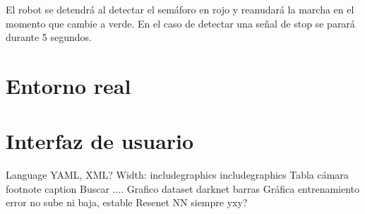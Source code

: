 El robot se detendrá al detectar el semáforo en rojo y reanudará la marcha en el momento que cambie a verde. En el caso de detectar una señal de stop se parará durante 5 segundos.\\


\section{Entorno real}
\label{section:real}


\section{Interfaz de usuario}
\label{subsection:interface}


Language YAML, XML?
Width: includegraphics includegraphics %
Tabla cámara
footnote caption
Buscar ....
Grafico dataset darknet barras
Gráfica entrenamiento error no sube ni baja, estable
Resenet
NN siempre yxy?